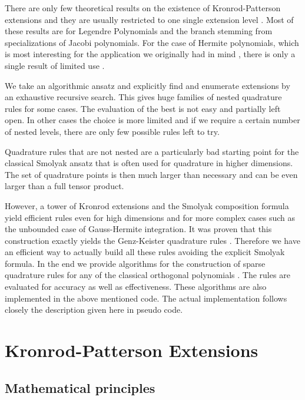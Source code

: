 \documentclass[a4paper,10pt]{article}
\begin{document}
There are only few theoretical results on the existence of Kronrod-Patterson
extensions and they are usually restricted to one single extension level
\cite{gautschi-notaris, gautschi, monegato1978, monegato1978_2, szegoe}.
Most of these results are for Legendre Polynomials and the branch stemming
from specializations of Jacobi polynomials. For the case of Hermite polynomials,
which is most interesting for the application we originally had in mind \cite{H_ladder_operators,
FGL_semiclassical_dynamics}, there is only a single result of limited use \cite{kahaner-monegato}.

We take an algorithmic ansatz and explicitly find and enumerate extensions by
an exhaustive recursive search. This gives huge families of nested quadrature
rules for some cases. The evaluation of the best is not easy and partially
left open. In other cases the choice is more limited and if we require a certain
number of nested levels, there are only few possible rules left to try.

Quadrature rules that are not nested are a particularly bad starting point
for the classical Smolyak ansatz that is often used for quadrature in higher
dimensions. The set of quadrature points is then much larger than necessary
and can be even larger than a full tensor product.

However, a tower of Kronrod extensions and the Smolyak composition formula
yield efficient rules even for high dimensions and for more complex cases such
as the unbounded case of Gauss-Hermite integration. It was proven \cite{novak_ritter}
that this construction exactly yields the Genz-Keister quadrature rules \cite{genz}.
Therefore we have an efficient way to actually build all these rules avoiding
the explicit Smolyak formula. In the end we provide algorithms for the construction
of sparse quadrature rules for any of the classical orthogonal polynomials \cite{B_kes}.
The rules are evaluated for accuracy as well as effectiveness. These algorithms
are also implemented in the above mentioned code. The actual implementation \cite{kes}
follows closely the description given here in pseudo code.


\section{Kronrod-Patterson Extensions}

\subsection{Mathematical principles}
\end{document}
